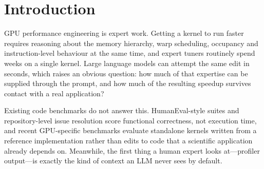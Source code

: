 \section{Introduction}
\label{sec:intro}
GPU performance engineering is expert work. Getting a kernel to run faster requires reasoning about the
memory hierarchy, warp scheduling, occupancy and instruction-level behaviour at the same time, and
expert tuners routinely spend weeks on a single kernel. Large language models can attempt the same edit
in seconds, which raises an obvious question: how much of that expertise can be supplied through the
prompt, and how much of the resulting speedup survives contact with a real application?

Existing code benchmarks do not answer this. HumanEval-style suites \cite{chen2021codex} and
repository-level issue resolution \cite{jimenez2024swebench} score functional correctness, not
execution time, and recent GPU-specific benchmarks \cite{ouyang2025kernelbench,nichols2024parallel}
evaluate standalone kernels written from a reference implementation rather than edits to code that a
scientific application already depends on. Meanwhile, the first thing a human expert looks at---profiler
output---is exactly the kind of context an LLM never sees by default.

